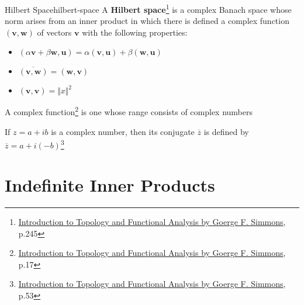 \begin{Definition}{Hilbert Space}{hilbert-space}
    A \textbf{Hilbert space}\footnote{\href{https://trello.com/c/3EPccNTa}{Introduction to Topology and Functional Analysis by Goerge F. Simmons}, p.245}
    is a complex Banach space whose norm arises from an inner product in which there is defined a complex function
    $(\boldsymbol{v}, \boldsymbol{w})$ of vectors $\boldsymbol{v}$ with the following properties:

    \begin{itemize}
        \item $(\alpha \boldsymbol{v} + \beta \boldsymbol{w}, \boldsymbol{u}) = \alpha(\boldsymbol{v}, \boldsymbol{u}) + \beta(\boldsymbol{w}, \boldsymbol{u})$
        \item $\overline{(\boldsymbol{v}, \boldsymbol{w})} = (\boldsymbol{w}, \boldsymbol{v})$
        \item $(\boldsymbol{v}, \boldsymbol{v}) = \Vert x \Vert^2$
    \end{itemize}

    \tcblower

    A complex function\footnote{\href{https://trello.com/c/3EPccNTa}{Introduction to Topology and Functional Analysis by Goerge F. Simmons}, p.17}
    is one whose range consists of complex numbers

    If $z = a + ib$ is a complex number, then its conjugate $\overline{z}$ is defined by $\overline{z} = a + i(-b)$\footnote{\href{https://trello.com/c/3EPccNTa}{Introduction to Topology and Functional Analysis by Goerge F. Simmons}, p.53}
\end{Definition}

\section{Indefinite Inner Products}

